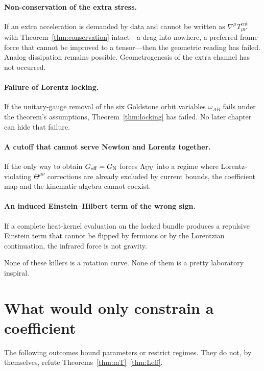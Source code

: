 \paragraph{Non-conservation of the extra stress.}
If an extra acceleration is demanded by data and cannot be written
as \(\nabla^\mu T_{\mu\nu}^{\mathrm{ent}}\) with
Theorem~\ref{thm:conservation} intact---a drag into nowhere, a
preferred-frame force that cannot be improved to a tensor---then
the geometric reading has failed. Analog dissipation remains
possible. Geometrogenesis of the extra channel has not occurred.

\paragraph{Failure of Lorentz locking.}
If the unitary-gauge removal of the six Goldstone orbit variables
\(\omega_{AB}\) fails under the theorem's assumptions,
Theorem~\ref{thm:locking} has failed. No later chapter can hide
that failure.

\paragraph{A cutoff that cannot serve Newton and Lorentz together.}
If the only way to obtain \(G_{\mathrm{eff}}=G_{\mathrm{N}}\) forces
\(\Lambda_{\mathrm{UV}}\) into a regime where Lorentz-violating \(\Theta^{\mu\nu}\)
corrections are already excluded by current bounds, the
coefficient map and the kinematic algebra cannot coexist.

\paragraph{An induced Einstein--Hilbert term of the wrong sign.}
If a complete heat-kernel evaluation on the locked bundle produces
a repulsive Einstein term that cannot be flipped by fermions or
by the Lorentzian continuation, the infrared force is not gravity.

None of these killers is a rotation curve. None of them is a
pretty laboratory inspiral.

\section{What would only constrain a coefficient}
\label{sec:ch16-constrain}

The following outcomes bound parameters or restrict regimes.
They do not, by themselves, refute Theorems~\ref{thm:mT}--\ref{thm:Leff}.

